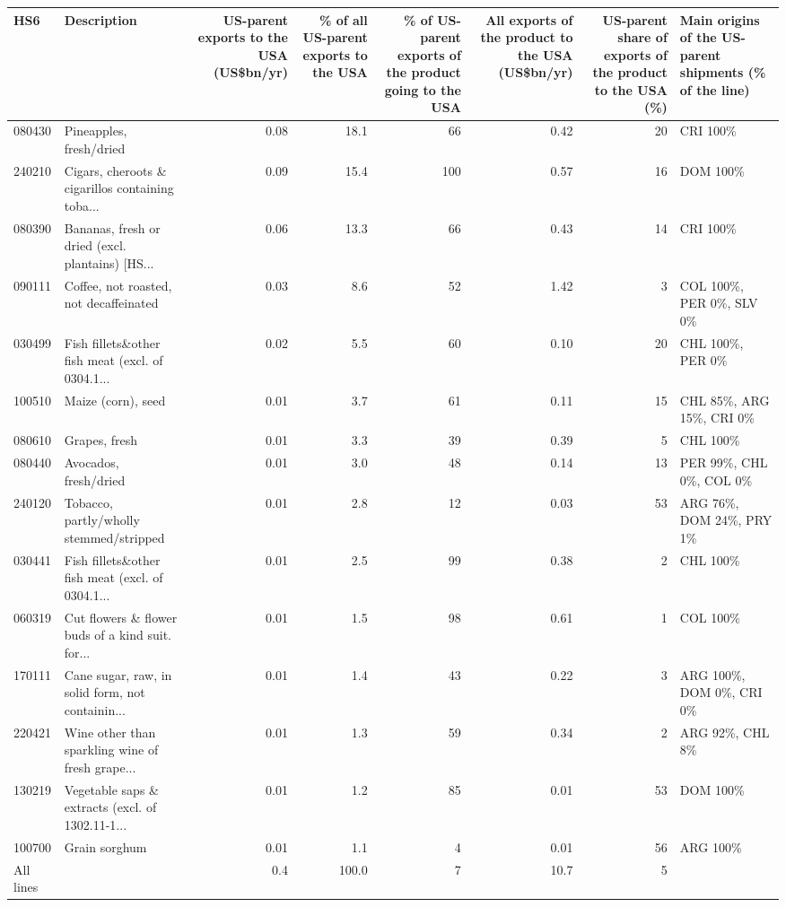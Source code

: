 \begin{tabular}{llrrrrrl}
\toprule
HS6 & Description & \multicolumn{1}{p{1.7cm}}{\raggedright US-parent exports to the USA (US\$bn/yr)} & \multicolumn{1}{p{1.7cm}}{\raggedright \% of all US-parent exports to the USA} & \multicolumn{1}{p{2.0cm}}{\raggedright \% of US-parent exports of the product going to the USA} & \multicolumn{1}{p{1.9cm}}{\raggedright All exports of the product to the USA (US\$bn/yr)} & \multicolumn{1}{p{2.2cm}}{\raggedright US-parent share of exports of the product to the USA (\%)} & \multicolumn{1}{p{2.6cm}}{\raggedright Main origins of the US-parent shipments (\% of the line)} \\
\midrule
080430 & Pineapples, fresh/dried & 0.08 & 18.1 & 66 & 0.42 & 20 & CRI 100\% \\
240210 & Cigars, cheroots \& cigarillos containing toba... & 0.09 & 15.4 & 100 & 0.57 & 16 & DOM 100\% \\
080390 & Bananas, fresh or dried (excl. plantains) [HS... & 0.06 & 13.3 & 66 & 0.43 & 14 & CRI 100\% \\
090111 & Coffee, not roasted, not decaffeinated & 0.03 & 8.6 & 52 & 1.42 & 3 & COL 100\%, PER 0\%, SLV 0\% \\
030499 & Fish fillets\&other fish meat (excl. of 0304.1... & 0.02 & 5.5 & 60 & 0.10 & 20 & CHL 100\%, PER 0\% \\
100510 & Maize (corn), seed & 0.01 & 3.7 & 61 & 0.11 & 15 & CHL 85\%, ARG 15\%, CRI 0\% \\
080610 & Grapes, fresh & 0.01 & 3.3 & 39 & 0.39 & 5 & CHL 100\% \\
080440 & Avocados, fresh/dried & 0.01 & 3.0 & 48 & 0.14 & 13 & PER 99\%, CHL 0\%, COL 0\% \\
240120 & Tobacco, partly/wholly stemmed/stripped & 0.01 & 2.8 & 12 & 0.03 & 53 & ARG 76\%, DOM 24\%, PRY 1\% \\
030441 & Fish fillets\&other fish meat (excl. of 0304.1... & 0.01 & 2.5 & 99 & 0.38 & 2 & CHL 100\% \\
060319 & Cut flowers \& flower buds of a kind suit. for... & 0.01 & 1.5 & 98 & 0.61 & 1 & COL 100\% \\
170111 & Cane sugar, raw, in solid form, not containin... & 0.01 & 1.4 & 43 & 0.22 & 3 & ARG 100\%, DOM 0\%, CRI 0\% \\
220421 & Wine other than sparkling wine of fresh grape... & 0.01 & 1.3 & 59 & 0.34 & 2 & ARG 92\%, CHL 8\% \\
130219 & Vegetable saps \& extracts (excl. of 1302.11-1... & 0.01 & 1.2 & 85 & 0.01 & 53 & DOM 100\% \\
100700 & Grain sorghum & 0.01 & 1.1 & 4 & 0.01 & 56 & ARG 100\% \\
\midrule
All lines & & 0.4 & 100.0 & 7 & 10.7 & 5 & \\
\bottomrule
\end{tabular}
